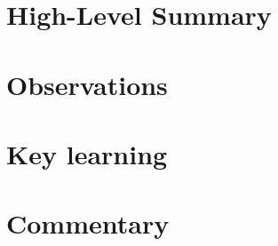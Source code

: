 \section{High-Level Summary}

\pagebreak

\section{Observations}

\pagebreak

\section{Key learning}

\pagebreak

\section{Commentary}